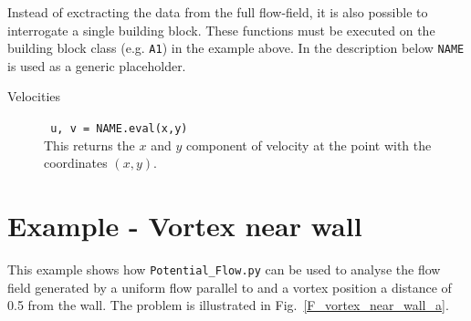 \documentclass[10pt,a4paper]{article}
\begin{document}
Instead of exctracting the data from the full flow-field, it is also possible to interrogate a single building block. 
These functions must be executed on the building block class (e.g. \verb'A1') in the example above. 
In the description below \verb'NAME' is used as a generic placeholder.   
\begin{description}
\item[Velocities] \verb' u, v = NAME.eval(x,y)' \\
This returns the $x$ and $y$ component of velocity at the point with the coordinates $(x, y)$.
\end{description}


\clearpage
\section{Example - Vortex near wall}
This example shows how \verb'Potential_Flow.py' can be used to analyse the flow field generated by a uniform flow parallel to and a vortex position a distance of \num{0.5} from the wall. 
The problem is illustrated in Fig.~\ref{F_vortex_near_wall_a}.
\end{document}

